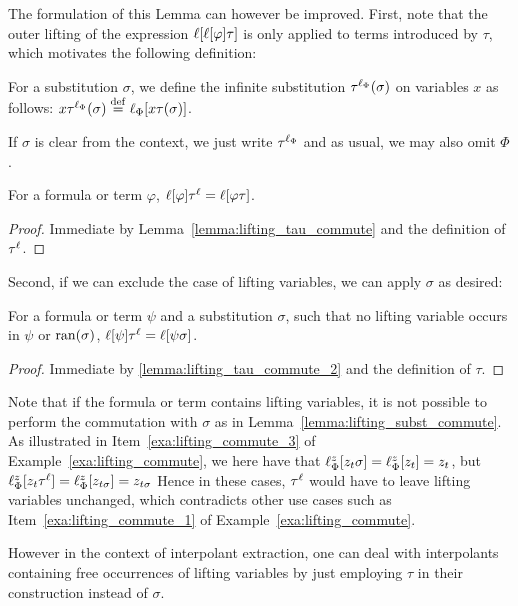 The formulation of this Lemma can however be improved.
First, note that the outer lifting of the expression $\ell[\ell[\varphi]\tau]$ is only applied to terms introduced by $\tau$, which motivates the following definition:

\begin{defi}[$\tauellphi$]
	For a substitution $\sigma$, we define the infinite substitution $\tau^{\ell_\Phi}(\sigma)$ on variables $x$ as follows: 
	$x\tauellphi(\sigma) \spas\defeq \lifphinovar{x\tau(\sigma)}$.

	If $\sigma$ is clear from the context, we just write $\tauellphi$ and as usual, we may also omit\nolinebreak{} $\Phi$.
\end{defi}



\begin{lemma}
	\label{lemma:lifting_tau_commute_2}
	For a formula or term $\varphi$,
	$\ell[\varphi]\tau^\ell = \ell[\varphi\tau]$.
\end{lemma}
\begin{proof}
	Immediate by Lemma~\ref{lemma:lifting_tau_commute} and the definition of $\tau^\ell$.
\end{proof}

Second, if we can exclude the case of lifting variables, we can apply $\sigma$ as desired:
\begin{lemma}
	\label{lemma:lifting_subst_commute}
	For a formula or term $\psi$ and a substitution $\sigma$, such that no lifting variable occurs in $\psi$ or $\operatorname{ran}(\sigma)$,
	$\ell[\psi]\tau^\ell = \ell[\psi\sigma]$.
\end{lemma}
\begin{proof}
	Immediate by \ref{lemma:lifting_tau_commute_2} and the definition of $\tau$.
\end{proof}

Note that if the formula or term contains lifting variables,
it is not possible to perform the commutation with $\sigma$ as in Lemma~\ref{lemma:lifting_subst_commute}.
As illustrated in Item~\ref{exa:lifting_commute_3} of Example~\ref{exa:lifting_commute},
we here have that $\ell_{\Phi}^{z}[z_t\sigma] = \ell_{\Phi}^{z}[z_t] = z_t$, but $\ell_{\Phi}^{z}[z_t\tau^\ell] = \ell_{\Phi}^{z}[z_{{t\sigma}}] = z_{{t\sigma}}$
Hence in these cases, $\tau^\ell$ would have to leave lifting variables unchanged, which contradicts other use cases such as Item~\ref{exa:lifting_commute_1} of Example~\ref{exa:lifting_commute}.

However in the context of interpolant extraction, one can deal with interpolants containing free occurrences of lifting variables by just employing $\tau$ in their construction instead of $\sigma$.


